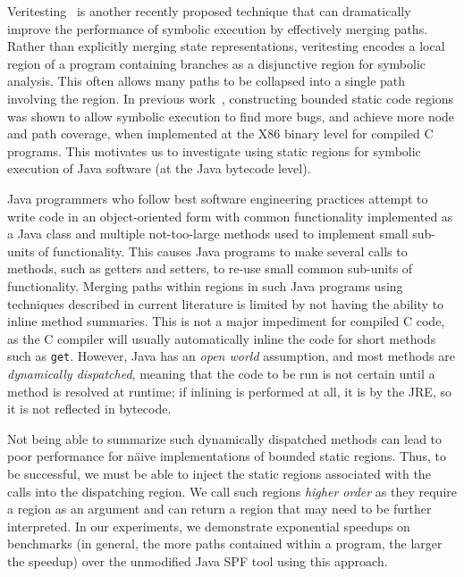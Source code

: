 %
 
%
Veritesting~\cite{veritesting} is another recently proposed technique that can dramatically improve the performance of symbolic execution by effectively merging paths.  Rather than explicitly merging state representations, veritesting encodes a local region of a program containing branches as a disjunctive region for symbolic analysis. This often allows many paths to be collapsed into a single path involving the region.  
%
In previous work~\cite{veritesting}, constructing bounded static code regions was shown to allow symbolic execution to find more bugs, and achieve more
node and path coverage, when implemented at the X86 binary level for compiled C programs.
%
This motivates us to investigate using static regions for symbolic execution of Java software (at the Java bytecode level).

Java programmers who follow best software engineering practices attempt to write code in an object-oriented
form with common functionality implemented as a Java class and multiple not-too-large methods used to implement small
sub-units of functionality.
%
This causes Java programs to make several calls to methods, such as getters and setters, to re-use small common sub-units
of functionality.
%
Merging paths within regions in such Java programs using techniques described in current literature is limited by not having the ability
to inline method summaries.
%
This is not a major impediment for compiled C code, as the C compiler will usually automatically inline the code for short
methods such as \texttt{get}.
%
However, Java has an {\em open world} assumption, and most methods are {\em dynamically dispatched}, meaning that the code to be
run is not certain until a method is resolved at runtime; if inlining is performed at all, it is by the JRE, so it is not reflected in bytecode.

Not being able to summarize such dynamically dispatched methods can lead to poor performance for
n\"aive implementations of bounded static regions.
%
Thus, to be successful, we must be able to inject the static regions associated with the calls into the dispatching
region.
%
We call such regions {\em higher order} as they require a region as an argument and can return a region that may need
to be further interpreted.
%
In our experiments, we demonstrate exponential speedups on benchmarks (in general, the more paths contained within a
program, the larger the speedup) over the unmodified Java SPF tool using this approach.

